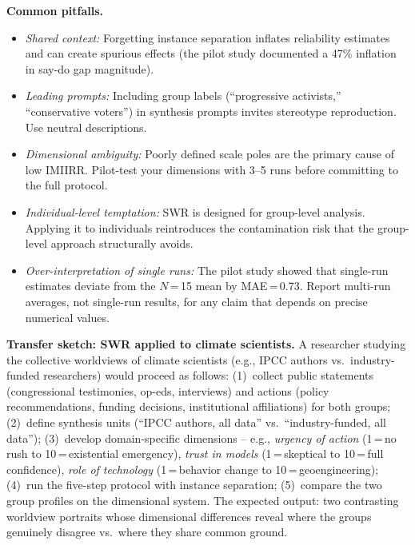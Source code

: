 \documentclass[11pt,a4paper]{article}
\begin{document}
\textbf{Common pitfalls.}
\begin{itemize}[nosep]
  \item \emph{Shared context:} Forgetting instance separation inflates reliability estimates and can create spurious effects (the pilot study documented a 47\% inflation in say-do gap magnitude).
  \item \emph{Leading prompts:} Including group labels (``progressive activists,'' ``conservative voters'') in synthesis prompts invites stereotype reproduction. Use neutral descriptions.
  \item \emph{Dimensional ambiguity:} Poorly defined scale poles are the primary cause of low IMIIRR. Pilot-test your dimensions with 3--5 runs before committing to the full protocol.
  \item \emph{Individual-level temptation:} SWR is designed for group-level analysis. Applying it to individuals reintroduces the contamination risk that the group-level approach structurally avoids.
  \item \emph{Over-interpretation of single runs:} The pilot study showed that single-run estimates deviate from the $N$\,=\,15 mean by MAE\,=\,0.73. Report multi-run averages, not single-run results, for any claim that depends on precise numerical values.
\end{itemize}

\textbf{Transfer sketch: SWR applied to climate scientists.} A researcher studying the collective worldviews of climate scientists (e.g., IPCC authors vs.\ industry-funded researchers) would proceed as follows: (1)~collect public statements (congressional testimonies, op-eds, interviews) and actions (policy recommendations, funding decisions, institutional affiliations) for both groups; (2)~define synthesis units (``IPCC authors, all data'' vs.\ ``industry-funded, all data''); (3)~develop domain-specific dimensions -- e.g., \emph{urgency of action} (1\,=\,no rush to 10\,=\,existential emergency), \emph{trust in models} (1\,=\,skeptical to 10\,=\,full confidence), \emph{role of technology} (1\,=\,behavior change to 10\,=\,geoengineering); (4)~run the five-step protocol with instance separation; (5)~compare the two group profiles on the dimensional system. The expected output: two contrasting worldview portraits whose dimensional differences reveal where the groups genuinely disagree vs.\ where they share common ground.


\end{document}
